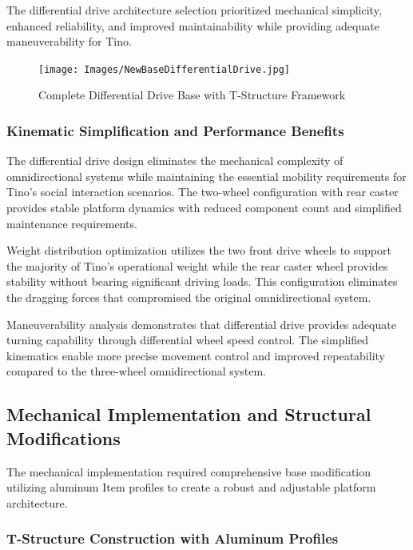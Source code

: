 The differential drive architecture selection prioritized mechanical simplicity, enhanced reliability, and improved maintainability while providing adequate maneuverability for Tino.

\begin{figure}[H]
    \centering
    \texttt{[image: Images/NewBaseDifferentialDrive.jpg]}
    \caption{Complete Differential Drive Base with T-Structure Framework}
    \label{fig:differential_base_complete}
\end{figure}

\subsubsection{Kinematic Simplification and Performance Benefits}

The differential drive design eliminates the mechanical complexity of omnidirectional systems while maintaining the essential mobility requirements for Tino's social interaction scenarios. The two-wheel configuration with rear caster provides stable platform dynamics with reduced component count and simplified maintenance requirements.

Weight distribution optimization utilizes the two front drive wheels to support the majority of Tino's operational weight while the rear caster wheel provides stability without bearing significant driving loads. This configuration eliminates the dragging forces that compromised the original omnidirectional system.

Maneuverability analysis demonstrates that differential drive provides adequate turning capability through differential wheel speed control. The simplified kinematics enable more precise movement control and improved repeatability compared to the three-wheel omnidirectional system.

\subsection{Mechanical Implementation and Structural Modifications}

The mechanical implementation required comprehensive base modification utilizing aluminum Item profiles to create a robust and adjustable platform architecture.

\subsubsection{T-Structure Construction with Aluminum Profiles}

